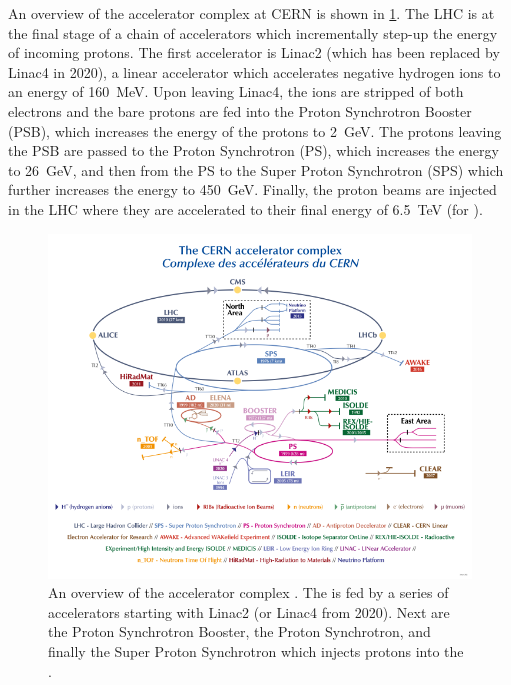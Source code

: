An overview of the accelerator complex at CERN is shown in \cref{fig:accelerator_complex}.
The LHC is at the final stage of a chain of accelerators which incrementally step-up the energy of incoming protons.
The first accelerator is Linac2 (which has been replaced by Linac4 in 2020), a linear accelerator which accelerates negative hydrogen ions to an energy of \SI{160}{\MeV}.
Upon leaving Linac4, the ions are stripped of both electrons and the bare protons are fed into the Proton Synchrotron Booster (PSB), which increases the energy of the protons to \SI{2}{\GeV}.
The protons leaving the PSB are passed to the Proton Synchrotron (PS), which increases the energy to \SI{26}{\GeV}, and then from the PS to the Super Proton Synchrotron (SPS) which further increases the energy to \SI{450}{\GeV}.
Finally, the proton beams are injected in the LHC where they are accelerated to their final energy of \SI{6.5}{\TeV} (for \runtwo).

\begin{figure}[!htbp]
  \centering
  \includegraphics[width=\textwidth]{chapters/2.detector/figs/accelerator_complex.pdf}
  \caption{
    An overview of the \CERN accelerator complex \cite{CERN:2012:accelerators}.
    The \LHC is fed by a series of accelerators starting with Linac2 (or Linac4 from 2020).
    Next are the Proton Synchrotron Booster, the Proton Synchrotron, and finally the Super Proton Synchrotron which injects protons into the \LHC.
  }
  \label{fig:accelerator_complex}
\end{figure}


